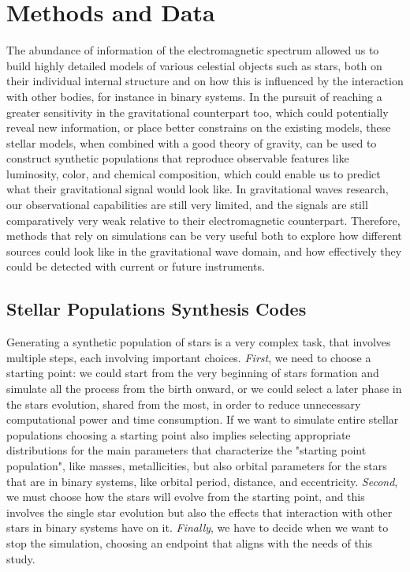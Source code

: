 \chapter{Methods and Data}
The abundance of information of the electromagnetic spectrum allowed us to build highly detailed models of various celestial objects such as stars, both on their individual internal structure and on how this is influenced by the interaction with other bodies, for instance in binary systems.
In the pursuit of reaching a greater sensitivity in the gravitational counterpart too, which could potentially reveal new information, or place better constrains on the existing models, these stellar models, when combined with a good theory of gravity, can be used to construct synthetic populations that reproduce observable features like luminosity, color, and chemical composition, which could enable us to predict what their gravitational signal would look like.
In gravitational waves research, our observational capabilities are still very limited, and the signals are still comparatively very weak relative to their electromagnetic counterpart. 
Therefore, methods that rely on simulations can be very useful both to  explore how different sources could look like in the gravitational wave domain, and how effectively they could be detected with current or future instruments.

\section{Stellar Populations Synthesis Codes}
Generating a synthetic population of stars is a very complex task, that involves multiple steps, each involving important choices.
\textit{First}, we need to choose a starting point: we could start from the very beginning of stars formation and simulate all the process from the birth onward, or we could select a later phase in the stars evolution, shared from the most, in order to reduce unnecessary computational power and time consumption. 
If we want to simulate entire stellar populations choosing a starting point also implies selecting appropriate distributions for the main parameters that characterize the "starting point population", like masses, metallicities, but also orbital parameters for the stars that are in binary systems, like orbital period, distance, and eccentricity. 
\textit{Second}, we must choose how the stars will evolve from the starting point, and this involves the single star evolution but also the effects that interaction with other stars in binary systems have on it.
\textit{Finally}, we have to decide when we want to stop the simulation, choosing an endpoint that aligns with the needs of this study.

